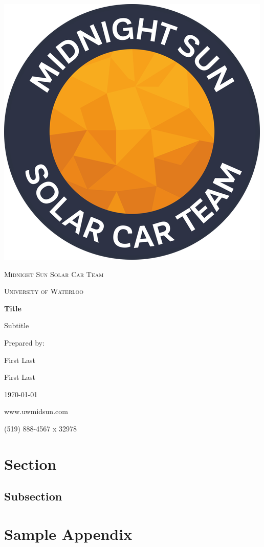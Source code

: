 \documentclass[12pt]{article}
\begin{document}
\begin{titlepage}
	\vspace*{2cm}
	\centering
	\includegraphics[width=.25\textwidth]{./images/midnightSunLogoCircle.png}\par
	\vspace{1.5cm}
	{\scshape\LARGE Midnight Sun Solar Car Team \par}
	{\scshape\large University of Waterloo\par}
	\vspace{2.2cm}
	{\huge\bfseries Title\par} %
	\vspace{0.2cm}
	\large Subtitle %
	\vspace{2.2cm}	
	\par Prepared by:\par
	First Last\par %
	First Last\par %
	\vspace{0.6cm} 
	\today\par
	\vfill
	www.uwmidsun.com \par
	(519) 888-4567 x 32978
\end{titlepage}

\section{Section}
\subsection{Subsection}

\pagebreak
{}


\pagebreak
\appendix
\section{Sample Appendix}
\label{app:simple}

\end{document}
